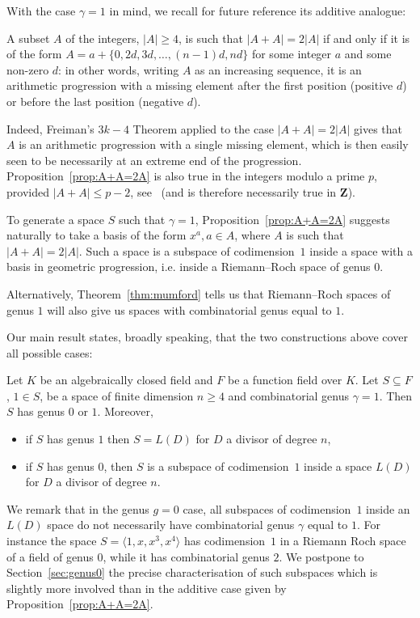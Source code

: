 \documentclass[ALCO,Unicode,ThmDefs]{cedram}
\newcommand*\Z{{\mathbf Z}}
\renewcommand{\geq}{\geqslant}
\renewcommand{\leq}{\leqslant}
\begin{document}
With the case $\gamma=1$ in mind, we recall for future reference its additive analogue:

\begin{prop}\label{prop:A+A=2A}
A subset $A$ of the integers, $|A|\geq4$, is such that $|A+A|=2|A|$ if and only if it is of the form $A=a+\{0,2d,3d,\ldots,(n-1)d,nd\}$ for some {integer $a$ and some} non-zero $d$: in other words, writing $A$ as an increasing sequence, it is an arithmetic progression with a missing element after the first position (positive $d$) or before the last position (negative $d$).
\end{prop}

Indeed, Freiman's $3k-4$ Theorem applied to the case $|A+A|=2|A|$ gives that $A$ is an arithmetic progression with a single missing element, which is then easily seen to be necessarily at an extreme end of the progression. Proposition~\ref{prop:A+A=2A} is also true in the integers modulo a prime $p$, provided $|A+A|\leq p-2$, see~\cite{hr00} (and is therefore necessarily true in $\Z$).

To generate a space $S$ such that $\gamma=1$, Proposition~\ref{prop:A+A=2A} suggests naturally to take a basis of the form $x^a, a\in A$, where $A$ is such that $|A+A|=2|A|$. Such a space is a subspace of codimension~$1$ inside a space with a basis in geometric progression, i.e. inside a Riemann--Roch space of genus $0$.

Alternatively, Theorem~\ref{thm:mumford} tells us that Riemann--Roch spaces of genus $1$ will also give us spaces with combinatorial genus equal to $1$.

Our main result states, broadly speaking, that the two constructions above cover all possible cases:

\begin{theo}\label{thm:main}
Let $K$ be an algebraically closed field and $F$ be a function field over $K$. Let $S \subseteq F$, $1\in S$, be a space of finite dimension $n\geq4$ and combinatorial genus $\gamma=1$. Then $S$ has genus $0$ or $1$. Moreover,
\begin{itemize}
\item if $S$ has genus $1$ then $S=L(D)$ for $D$ a divisor of degree $n$,
\item if $S$ has genus $0$, then $S$ is a subspace of codimension~$1$ inside a space $L(D)$ for $D$ a divisor of degree $n$.
\end{itemize}
\end{theo}

We remark that in the genus $g=0$ case, all subspaces of codimension~$1$ inside an $L(D)$ space do not necessarily have combinatorial genus $\gamma$ equal to $1$. { For instance the space $S=\langle 1, x, x^3, x^4 \rangle$ has codimension~$1$ in a Riemann Roch space of a field of genus $0$, while it has combinatorial genus $2$.} We postpone to Section~\ref{sec:genus0} the precise characterisation of such subspaces which is slightly more involved than in the additive case given by Proposition~\ref{prop:A+A=2A}.
\end{document}
